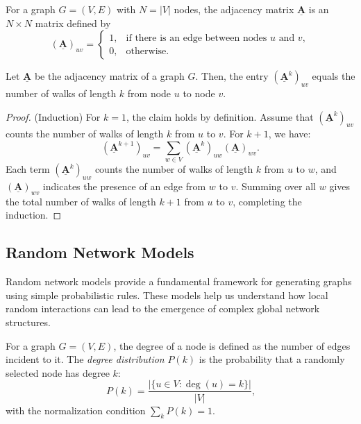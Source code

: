 \documentclass[11pt, headings=standardclasses, parskip=half, twoside]{scrartcl}
\newcommand{\matr}[1]{\underline{\boldsymbol{#1}}}
\begin{document}
\begin{definition}\label{def:adjacency}
For a graph \(G=(V,E)\) with \(N=|V|\) nodes, the adjacency matrix \(\matr{A}\) is an \(N\times N\) matrix defined by
\[
(\matr{A})_{uv}=
\begin{cases}
1, & \text{if there is an edge between nodes } u \text{ and } v,\\[1mm]
0, & \text{otherwise}.
\end{cases} 
\]
\end{definition}

\begin{theorem}\label{thm:walks}
Let \(\matr{A}\) be the adjacency matrix of a graph \(G\). Then, the entry \((\matr{A}^k)_{uv}\) equals the number of walks of length \(k\) from node \(u\) to node \(v\).
\end{theorem}
\begin{proof}
(Induction)
For \(k=1\), the claim holds by definition. 
Assume that \((\matr{A}^k)_{uv}\) counts the number of walks of length \(k\) from \(u\) to \(v\).
For \(k+1\), we have:
\[
(\matr{A}^{k+1})_{uv}=\sum_{w\in V} (\matr{A}^k)_{uw}(\matr{A})_{wv} \text{.}
\]
Each term \((\matr{A}^k)_{uw}\) counts the number of walks of length \(k\) from \(u\) to \(w\), and \((\matr{A})_{wv}\) indicates the presence of an edge from \(w\) to \(v\).
Summing over all \(w\) gives the total number of walks of length \(k+1\) from \(u\) to \(v\), completing the induction.
\end{proof}

\subsection{Random Network Models}\label{subsec:models}
Random network models provide a fundamental framework for generating graphs using simple probabilistic rules. 
These models help us understand how local random interactions can lead to the emergence of complex global network structures.

\begin{definition}\label{def:degree-distribution}
For a graph \(G=(V,E)\), the degree of a node is defined as the number of edges incident to it. 
The \emph{degree distribution} \(P(k)\) is the probability that a randomly selected node has degree \(k\):
\[
P(k)=\frac{|\{u\in V: \deg(u)=k\}|}{|V|} \text{,}
\]
with the normalization condition \(\sum_{k}P(k)=1\).
\end{definition}
\end{document}
